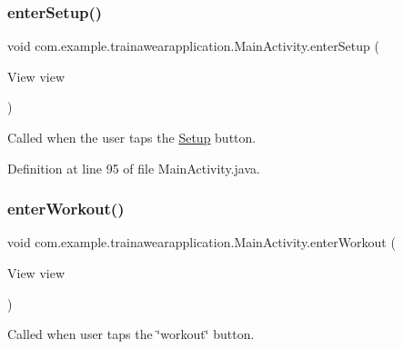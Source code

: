 \subsubsection{\texorpdfstring{enterSetup()}{enterSetup()}}
{\footnotesize\ttfamily void com.\+example.\+trainawearapplication.\+Main\+Activity.\+enter\+Setup (\begin{DoxyParamCaption}\item[{View}]{view }\end{DoxyParamCaption})\hspace{0.3cm}{\ttfamily [inline]}}



Called when the user taps the \mbox{\hyperlink{classcom_1_1example_1_1trainawearapplication_1_1_setup}{Setup}} button. 



Definition at line 95 of file Main\+Activity.\+java.


\begin{DoxyCode}{0}

\end{DoxyCode}
\mbox{\label{classcom_1_1example_1_1trainawearapplication_1_1_main_activity_a1f9bee72c098b97dc196ab9b9af6fe00}} 
\subsubsection{\texorpdfstring{enterWorkout()}{enterWorkout()}}
{\footnotesize\ttfamily void com.\+example.\+trainawearapplication.\+Main\+Activity.\+enter\+Workout (\begin{DoxyParamCaption}\item[{View}]{view }\end{DoxyParamCaption})\hspace{0.3cm}{\ttfamily [inline]}}



Called when user taps the \char`\"{}workout\char`\"{} button. 



